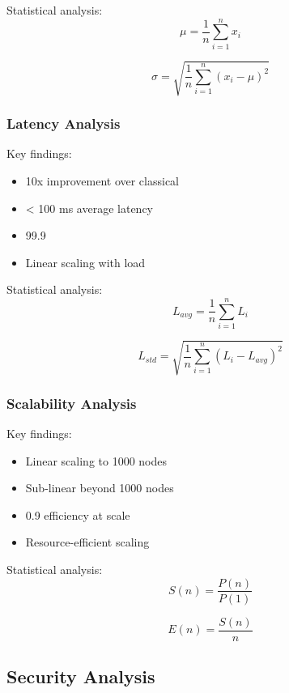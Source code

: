 \documentclass[12pt]{article}
\begin{document}
Statistical analysis:
\begin{equation}
\mu = \frac{1}{n}\sum_{i=1}^n x_i
\end{equation}

\begin{equation}
\sigma = \sqrt{\frac{1}{n}\sum_{i=1}^n (x_i - \mu)^2}
\end{equation}

\subsubsection{Latency Analysis}

Key findings:
\begin{itemize}
\item 10x improvement over classical
\item < 100 ms average latency
\item 99.9%
\item Linear scaling with load
\end{itemize}

Statistical analysis:
\begin{equation}
L_{avg} = \frac{1}{n}\sum_{i=1}^n L_i
\end{equation}

\begin{equation}
L_{std} = \sqrt{\frac{1}{n}\sum_{i=1}^n (L_i - L_{avg})^2}
\end{equation}

\subsubsection{Scalability Analysis}

Key findings:
\begin{itemize}
\item Linear scaling to 1000 nodes
\item Sub-linear beyond 1000 nodes
\item 0.9 efficiency at scale
\item Resource-efficient scaling
\end{itemize}

Statistical analysis:
\begin{equation}
S(n) = \frac{P(n)}{P(1)}
\end{equation}

\begin{equation}
E(n) = \frac{S(n)}{n}
\end{equation}

\subsection{Security Analysis}
\end{document}
